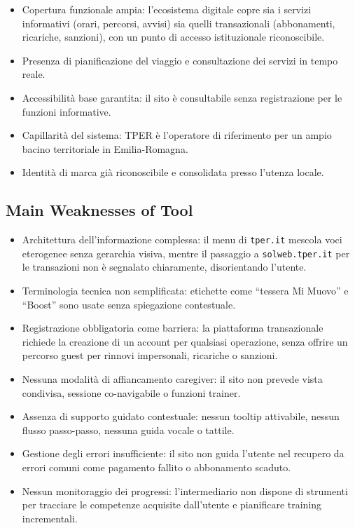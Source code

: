 \documentclass[11pt,a4paper]{article}
\begin{document}
\begin{itemize}
    \item Copertura funzionale ampia: l'ecosistema digitale copre sia
    i servizi informativi (orari, percorsi, avvisi) sia quelli
    transazionali (abbonamenti, ricariche, sanzioni), con un punto
    di accesso istituzionale riconoscibile.
    \item Presenza di pianificazione del viaggio e consultazione dei servizi in tempo reale.
    \item Accessibilità base garantita: il sito è consultabile senza registrazione per le funzioni informative.
    \item Capillarità del sistema: TPER è l'operatore di riferimento per un ampio bacino territoriale in Emilia-Romagna.
    \item Identità di marca già riconoscibile e consolidata presso l’utenza locale.
\end{itemize}

\subsection*{Main Weaknesses of Tool}

\begin{itemize}
    \item Architettura dell'informazione complessa: il menu di
    \texttt{tper.it} mescola voci eterogenee senza gerarchia visiva,
    mentre il passaggio a \texttt{solweb.tper.it} per le transazioni
    non è segnalato chiaramente, disorientando l'utente.
    \item Terminologia tecnica non semplificata: etichette come
    ``tessera Mi Muovo'' e ``Boost'' sono usate senza spiegazione
    contestuale.
    \item Registrazione obbligatoria come barriera: la piattaforma
    transazionale richiede la creazione di un account per qualsiasi
    operazione, senza offrire un percorso guest per rinnovi
    impersonali, ricariche o sanzioni.
    \item Nessuna modalità di affiancamento caregiver: il sito non prevede vista condivisa, sessione co-navigabile o funzioni trainer.
    \item Assenza di supporto guidato contestuale: nessun tooltip attivabile, nessun flusso passo-passo, nessuna guida vocale o tattile.
    \item Gestione degli errori insufficiente: il sito non guida l'utente nel recupero da errori comuni come pagamento fallito o abbonamento scaduto.
    \item Nessun monitoraggio dei progressi: l'intermediario non dispone di strumenti per tracciare le competenze acquisite dall'utente e pianificare training incrementali.
\end{itemize}
\end{document}
